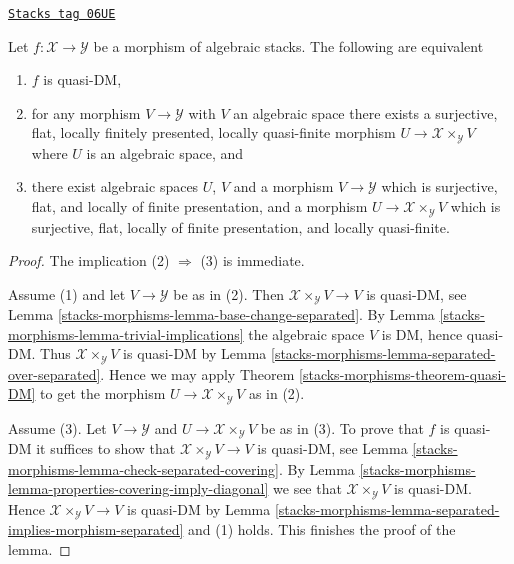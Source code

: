 \begin{lemma}
\label{stacks-morphisms-lemma-characterize-quasi-DM}
\href{https://stacks.math.columbia.edu/tag/06UE}{\texttt{Stacks tag 06UE}}

Let $f : \mathcal{X} \to \mathcal{Y}$ be a morphism of algebraic stacks.
The following are equivalent
\begin{enumerate}
\item $f$ is quasi-DM,
\item for any morphism $V \to \mathcal{Y}$ with $V$ an algebraic space
there exists a surjective, flat, locally finitely presented, locally
quasi-finite morphism $U \to \mathcal{X} \times_\mathcal{Y} V$ where
$U$ is an algebraic space, and
\item there exist algebraic spaces $U$, $V$ and a morphism
$V \to \mathcal{Y}$ which is surjective, flat, and
locally of finite presentation, and a morphism
$U \to \mathcal{X} \times_\mathcal{Y} V$ which is surjective, flat,
locally of finite presentation, and locally quasi-finite.
\end{enumerate}
\end{lemma}

\begin{proof}
The implication (2) $\Rightarrow$ (3) is immediate.

\medskip\noindent
Assume (1) and let $V \to \mathcal{Y}$ be as in (2). Then
$\mathcal{X} \times_\mathcal{Y} V \to V$ is quasi-DM, see
Lemma \ref{stacks-morphisms-lemma-base-change-separated}.
By
Lemma \ref{stacks-morphisms-lemma-trivial-implications}
the algebraic space $V$ is DM, hence quasi-DM. Thus
$\mathcal{X} \times_\mathcal{Y} V$ is quasi-DM by
Lemma \ref{stacks-morphisms-lemma-separated-over-separated}.
Hence we may apply
Theorem \ref{stacks-morphisms-theorem-quasi-DM}
to get the morphism $U \to \mathcal{X} \times_\mathcal{Y} V$
as in (2).

\medskip\noindent
Assume (3). Let $V \to \mathcal{Y}$ and
$U \to \mathcal{X} \times_\mathcal{Y} V$ be as in (3).
To prove that $f$ is quasi-DM it suffices to show that
$\mathcal{X} \times_\mathcal{Y} V \to V$ is quasi-DM, see
Lemma \ref{stacks-morphisms-lemma-check-separated-covering}.
By
Lemma \ref{stacks-morphisms-lemma-properties-covering-imply-diagonal}
we see that $\mathcal{X} \times_\mathcal{Y} V$ is quasi-DM.
Hence $\mathcal{X} \times_\mathcal{Y} V \to V$ is quasi-DM by
Lemma \ref{stacks-morphisms-lemma-separated-implies-morphism-separated}
and (1) holds. This finishes the proof of the lemma.
\end{proof}

